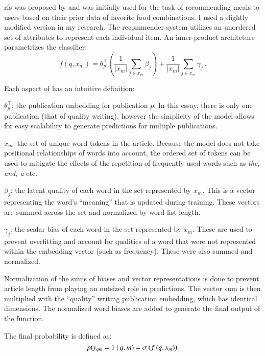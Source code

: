 \gls{rfs} was proposed by \textcite{altosaar2020rankfromsets:} and was initially used for the task of recommending meals to users based on their prior data of favorite food combinations. I used a slightly modified version in my research. The recommender system utilizes an unordered set of attributes to represent each individual item. An inner-product architeture parametrizes the classifier:
\begin{equation}
\label{eq:inner-product}
  f\left(q, x_m\right) = \theta_p^\top\left(\frac{1}{|x_m|}\sum_{j\in x_m}
  \beta_j\right) + \frac{1}{|x_m|}\sum_{j\in x_m}
  \gamma_j\, .
\end{equation}

Each aspect of  has an intuitive definition:

$\theta_p^\top$: the publication embedding for publication $p$. In this essay, there is only one 
publication (that of quality writing), however the simplicity of the model allows for easy 
scalability to generate predictions for multiple publications.

$x_m$: the set of unique word tokens in the article. Because the model does not take 
positional relationships of words into account, the ordered set of tokens can be used to   
mitigate the effects of the repetition of frequently used words such as \emph{the, and, a} etc.

$\beta_j$: the latent quality of each word in the set represented by $x_m$. This is a vector representing the word’s “meaning” that is updated during training. These vectors are summed across the set and normalized by word-list length.

$\gamma_j$: the scalar bias of each word in the set represented by $x_m$. These are used to prevent overfitting and account for qualities of a word that were not represented within the embedding vector (such as frequency). These were also summed and normalized.

Normalization of the sums of biases and vector representations is done to prevent article length from playing an outsized role in predictions. The vector sum is then multiplied with the “quality” writing publication embedding, which has identical dimensions. The normalized word biases are added to generate the final output of the function.

The final probability is defined as:
\begin{equation}
\label{eq:sigmoid_rfs}
p(y_{qm} = 1 ~\vert~ q, m) = \sigma\left( f \left (q, x_m\right) \right)\, 
\end{equation}

